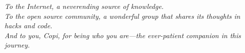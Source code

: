 \newpage
\vspace*{\fill}
\begin{center}
\textit{To the Internet, a neverending source of knowledge.\\
To the open source community, a wonderful group that shares its thoughts in hacks and code.\\
And to you, Copi, for being who you are---the ever-patient companion in this journey.}
\end{center}
\vspace*{\fill}
